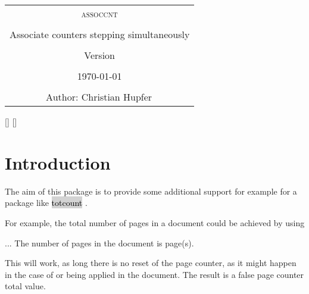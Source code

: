 \documentclass[12pt,paper=a4]{article}
\newcommand{\MarkupPackageName}[2][lightgray]{%
\colorbox{#1}{\textcolor{black}{#2}}%
}%
\def\packageversion{\assoccntpackageversion}%
\newcommand{\PackageDocName}{assoccnt}%
\begin{document}
\mmddyyyydate


\setlength{\parindent}{0pt}

\thispagestyle{empty}%

\begin{center}
\begin{tcolorbox}[colback=yellow!30!white,width=0.8\textwidth]
\large \bfseries%
\begin{center}%
\begin{tabular}{c}%
\textsc{\PackageDocName} \tabularnewline
\tabularnewline
Associate counters stepping simultaneously \tabularnewline
\tabularnewline
Version \packageversion \tabularnewline
\tabularnewline
\today \tabularnewline
\tabularnewline
\addtocounter{footnote}{2}
Author: Christian Hupfer\(^\mathrm{\fnsymbol{footnote}}\)%
\tabularnewline
\end{tabular}
\end{center}
\end{tcolorbox}
\makeatletter
\renewcommand{\thefootnote}{\fnsymbol{footnote}}%
%
\makeatother

\end{center}

\tableofcontents
\clearpage




\pagestyle{scrheadings}%
\setheadsepline{2pt}[\color{blue}]
\setfootsepline{2pt}[\color{brown}]
\ifoot{\PackageDocName}
\cfoot{\packageversion}
\ofoot{\today}

\setcounter{footnote}{0}


\section{Introduction}

The aim of this package is to provide some additional support for example for a package like \MarkupPackageName{totcount}. 

For example, the total number of pages in a document could be achieved by using

\begin{dispExample}%
...
The number of pages in the document is \number{} page(s). 
\end{dispExample}%

This will work, as long there is no reset of the page counter, as it might happen in the case of  or   being applied in the document. The result is a false page counter total value. 
\end{document}
